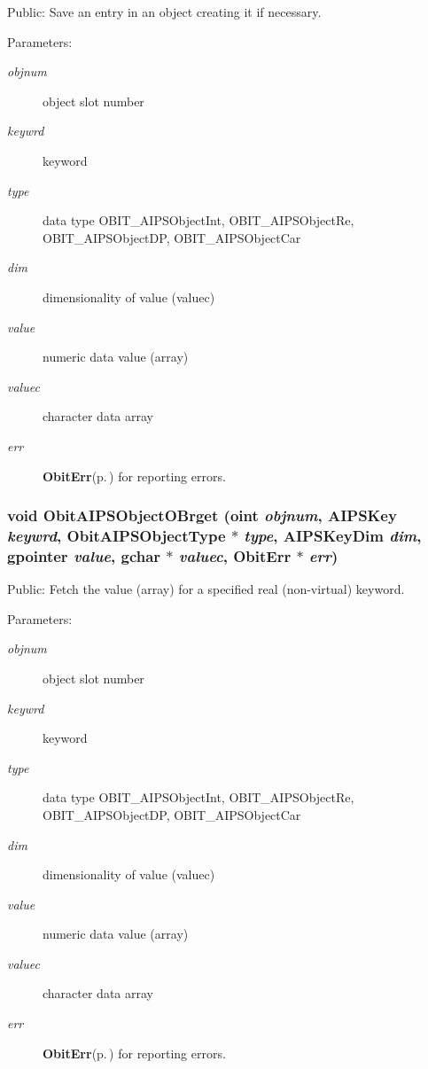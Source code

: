 Public: Save an entry in an object creating it if necessary. 

\begin{Desc}
\item[Parameters:]
\begin{description}
\item[{\em objnum}]object slot number \item[{\em keywrd}]keyword \item[{\em type}]data type OBIT\_\-AIPSObject\-Int, OBIT\_\-AIPSObject\-Re, OBIT\_\-AIPSObject\-DP, OBIT\_\-AIPSObject\-Car \item[{\em dim}]dimensionality of value (valuec) \item[{\em value}]numeric data value (array) \item[{\em valuec}]character data array \item[{\em err}]{\bf Obit\-Err}{\rm (p.\,\pageref{structObitErr})} for reporting errors. \end{description}
\end{Desc}
\subsubsection{\setlength{\rightskip}{0pt plus 5cm}void Obit\-AIPSObject\-OBrget ({\bf oint} {\em objnum}, {\bf AIPSKey} {\em keywrd}, Obit\-AIPSObject\-Type $\ast$ {\em type}, {\bf AIPSKey\-Dim} {\em dim}, gpointer {\em value}, gchar $\ast$ {\em valuec}, {\bf Obit\-Err} $\ast$ {\em err})}\label{ObitAIPSObject_8h_a13}


Public: Fetch the value (array) for a specified real (non-virtual) keyword. 

\begin{Desc}
\item[Parameters:]
\begin{description}
\item[{\em objnum}]object slot number \item[{\em keywrd}]keyword \item[{\em type}]data type OBIT\_\-AIPSObject\-Int, OBIT\_\-AIPSObject\-Re, OBIT\_\-AIPSObject\-DP, OBIT\_\-AIPSObject\-Car \item[{\em dim}]dimensionality of value (valuec) \item[{\em value}]numeric data value (array) \item[{\em valuec}]character data array \item[{\em err}]{\bf Obit\-Err}{\rm (p.\,\pageref{structObitErr})} for reporting errors. \end{description}
\end{Desc}
